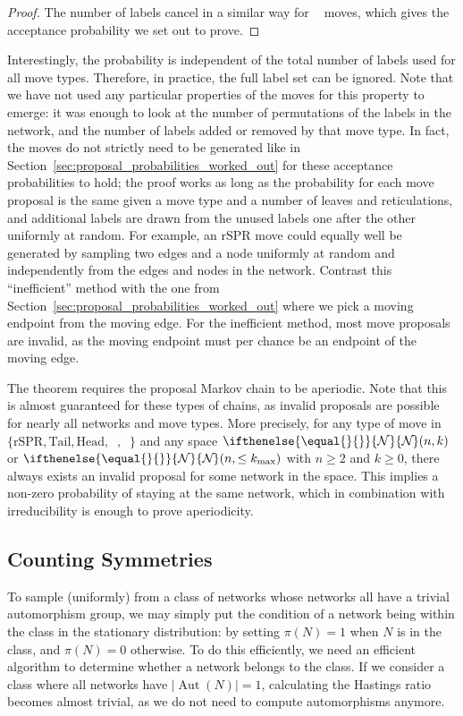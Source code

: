 \documentclass{article}
\theoremstyle{definition}
\newcommand{\N}[1][]{
\ifthenelse{\equal{#1}{}}{\mathcal{N}}{\mathcal{N}_{#1}}%
}
\DeclareMathOperator{\Aut}{Aut}
\DeclareMathOperator{\VM}{Vert^{--}}
\DeclareMathOperator{\VP}{Vert^+}
\newcommand{\Tail}{\mathrm{Tail}}
\newcommand{\Head}{\mathrm{Head}}
\newcommand{\rSPR}{\mathrm{rSPR}}
\begin{document}
\begin{proof}
    The number of labels cancel in a similar way for $\VM$ moves, which gives the acceptance probability we set out to prove.
\end{proof}

Interestingly, the probability is independent of the total number of labels used for all move types. Therefore, in practice, the full label set can be ignored. Note that we have not used any particular properties of the moves for this property to emerge: it was enough to look at the number of permutations of the labels in the network, and the number of labels added or removed by that move type. In fact, the moves do not strictly need to be generated like in Section~\ref{sec:proposal_probabilities_worked_out} for these acceptance probabilities to hold; the proof works as long as the probability for each move proposal is the same given a move type and a number of leaves and reticulations, and additional labels are drawn from the unused labels one after the other uniformly at random. For example, an $\rSPR$ move could equally well be generated by sampling two edges and a node uniformly at random and independently from the edges and nodes in the network. Contrast this ``inefficient'' method with the one from Section~\ref{sec:proposal_probabilities_worked_out} where we pick a moving endpoint from the moving edge. For the inefficient method, most move proposals are invalid, as the moving endpoint must per chance be an endpoint of the moving edge.

The theorem requires the proposal Markov chain to be aperiodic. Note that this is almost guaranteed for these types of chains, as invalid proposals are possible for nearly all networks and move types. More precisely, for any type of move in $\{\rSPR, \Tail, \Head, \VP, \VM\}$ and any space $\N(n,k)$ or $\N(n, \leq k_{\mathrm{max}})$ with $n\geq 2$ and $k\geq 0$, there always exists an invalid proposal for some network in the space. This implies a non-zero probability of staying at the same network, which in combination with irreducibility is enough to prove aperiodicity. 

\subsection{Counting Symmetries}
To sample (uniformly) from a class of networks whose networks all have a trivial automorphism group, we may simply put the condition of a network being within the class in the stationary distribution: by setting $\pi(N)=1$ when $N$ is in the class, and $\pi(N)=0$ otherwise. To do this efficiently, we need an efficient algorithm to determine whether a network belongs to the class. If we consider a class where all networks have $|\Aut(N)|=1$, calculating the Hastings ratio becomes almost trivial, as we do not need to compute automorphisms anymore. 
\end{document}
